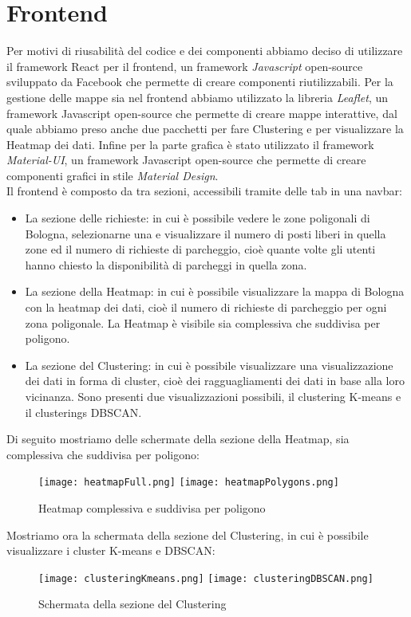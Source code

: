 \documentclass[../../Report.tex]{subfiles}
\begin{document}
\section{Frontend}
    Per  motivi di riusabilità del codice e dei componenti abbiamo deciso di utilizzare il framework React per il frontend, un framework \emph{Javascript} open-source sviluppato da Facebook che permette di creare componenti riutilizzabili. 
    Per la gestione delle mappe sia nel frontend abbiamo utilizzato la libreria \emph{Leaflet}, un framework Javascript open-source che permette di creare mappe interattive, dal quale abbiamo preso anche due pacchetti per fare Clustering e per visualizzare la Heatmap dei dati. Infine per la parte grafica è stato utilizzato il framework \emph{Material-UI}, un framework Javascript open-source che permette di creare componenti grafici in stile \emph{Material Design}.\\
    Il frontend è composto da tra sezioni, accessibili tramite delle tab in una navbar: 
    \begin{itemize}
      \item La sezione delle richieste: in cui è possibile vedere le zone poligonali di Bologna, selezionarne una e visualizzare il numero di posti liberi in quella zone ed il numero di richieste di parcheggio, cioè quante volte gli utenti hanno chiesto la disponibilità di parcheggi in quella zona.
      \item La sezione della Heatmap: in cui è possibile visualizzare la mappa di Bologna con la heatmap dei dati, cioè il numero di richieste di parcheggio per ogni zona poligonale. La Heatmap è visibile sia complessiva che suddivisa per poligono.
      \item La sezione del Clustering: in cui è possibile visualizzare una visualizzazione dei dati in forma di cluster, cioè dei ragguagliamenti dei dati in base alla loro vicinanza. Sono presenti due visualizzazioni possibili, il clustering K-means e il clusterings DBSCAN. 
    \end{itemize}
    Di seguito mostriamo delle schermate della sezione della Heatmap, sia complessiva che suddivisa per poligono:
    \begin{figure}[H]
        \centering
        \texttt{[image: heatmapFull.png]}
        \texttt{[image: heatmapPolygons.png]}
        \caption{Heatmap complessiva e suddivisa per poligono}
        \label{fig:heatmap}
    \end{figure}
    Mostriamo ora la schermata della sezione del Clustering, in cui è possibile visualizzare i cluster K-means e DBSCAN:
    \begin{figure}[H]
        \centering
        \texttt{[image: clusteringKmeans.png]}
        \texttt{[image: clusteringDBSCAN.png]}
        \caption{Schermata della sezione del Clustering}
        \label{fig:clustering}
    \end{figure}
    

    
\end{document}
